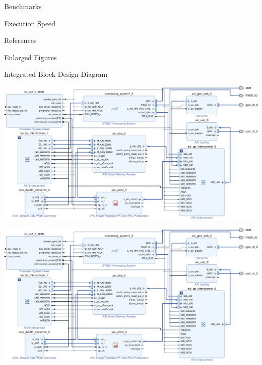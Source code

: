 \documentclass{matthijs}
\begin{document}
\begin{hoofdstuk}{Benchmarks}
\begin{paragraaf}{Execution Speed}
		\end{paragraaf}

	\end{hoofdstuk}
	
	\begin{hoofdstuk}{References}

		\printbibliography[heading=none]

	\end{hoofdstuk}

	\begin{appendices}
		\begin{hoofdstuk}{Enlarged Figures}
			\begin{paragraaf}{Integrated Block Design Diagram}
				\vspace{1cm}

			

				\centerline{\includegraphics[angle=90, origin=c, clip, trim=12.90cm 0 0 0, width=1.25\textwidth]{hw-block-diagram-v2-crop-asset.pdf}}
				\clearpage
				\centerline{\includegraphics[angle=90, origin=c, clip, trim=0 0 16.60cm 0, width=1.25\textwidth]{hw-block-diagram-v2-crop-asset.pdf}}

			\end{paragraaf}
		\end{hoofdstuk}
	\end{appendices}

	\clearpage
	\thispagestyle{empty}
	\addtocounter{page}{-1}
	\
	\clearpage
\end{document}
